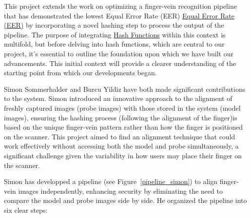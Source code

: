 This project extends the work on optimizing a finger-vein recognition pipeline that has demonstrated the lowest Equal Error Rate (EER) \hyperref[def:EER]{Equal Error Rate (EER)} by incorporating a novel hashing step to process the output of the pipeline. The purpose of integrating \hyperref[def:Hash_Function]{Hash Functions} within this context is multifold, but before delving into hash functions, which are central to our project, it's essential to outline the foundation upon which we have built our advancements. This initial context will provide a clearer understanding of the starting point from which our developments began.

Simon Sommerhalder and Burcu Yildiz have both made significant contributions to the system. Simon introduced an innovative approach to the alignment of freshly captured images (probe images) with those stored in the system (model images), ensuring the hashing process (following the alignment of the finger)is based on the unique finger-vein pattern rather than how the finger is positioned on the scanner. This project aimed to find an alignment technique that could work effectively without accessing both the model and probe simultaneously, a significant challenge given the variability in how users may place their finger on the scanner.

Simon has developped a pipeline (see Figure~\ref{pipeline_simon}) to align finger-vein images independently, enhancing security by eliminating the need to compare the model and probe images side by side. He organized the pipeline into six clear steps:

